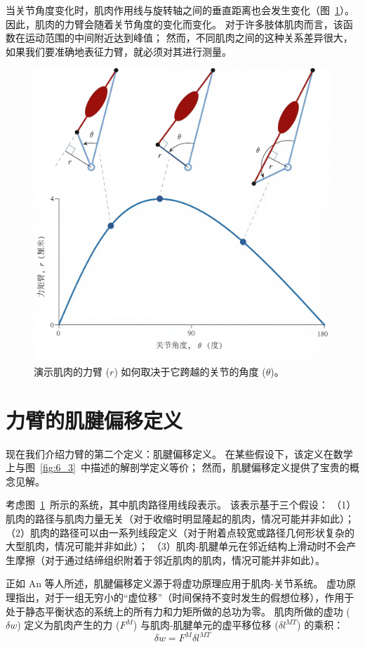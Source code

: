 当关节角度变化时，肌肉作用线与旋转轴之间的垂直距离也会发生变化（图~\ref{fig:6_4}）。
因此，肌肉的力臂会随着关节角度的变化而变化。
对于许多肢体肌肉而言，该函数在运动范围的中间附近达到峰值；
然而，不同肌肉之间的这种关系差异很大，如果我们要准确地表征力臂，就必须对其进行测量。


\begin{figure}[!htb]
	\centering
	\includegraphics[width=0.8\linewidth]{chap6/6_4}
	\caption{演示肌肉的力臂 ($r$) 如何取决于它跨越的关节的角度 ($\theta$)。 \label{fig:6_4}}
\end{figure}


\section{力臂的肌腱偏移定义}

现在我们介绍力臂的第二个定义：肌腱偏移定义。
在某些假设下，该定义在数学上与图~\ref{fig:6_3}~中描述的解剖学定义等价；
然而，肌腱偏移定义提供了宝贵的概念见解。


考虑图~\ref{fig:6_4}~所示的系统，其中肌肉路径用线段表示。
该表示基于三个假设：
（1）肌肉的路径与肌肉力量无关（对于收缩时明显隆起的肌肉，情况可能并非如此）；
（2）肌肉的路径可以由一系列线段定义（对于附着点较宽或路径几何形状复杂的大型肌肉，情况可能并非如此）；
（3）肌肉-肌腱单元在邻近结构上滑动时不会产生摩擦（对于通过结缔组织附着于邻近肌肉的肌肉，情况可能并非如此）。


正如 An 等人\cite{an1984determination}所述，肌腱偏移定义源于将虚功原理应用于肌肉-关节系统。
虚功原理指出，对于一组无穷小的“虚位移”（时间保持不变时发生的假想位移），作用于处于静态平衡状态的系统上的所有力和力矩所做的总功为零。
肌肉所做的虚功 ($\delta w$) 定义为肌肉产生的力 ($F^M$) 与肌肉-肌腱单元的虚平移位移 ($\delta l^{MT}$) 的乘积：
%
\begin{equation}
	\delta w = F^M \delta l^{MT}
	\label{eq:6_6}
\end{equation}


